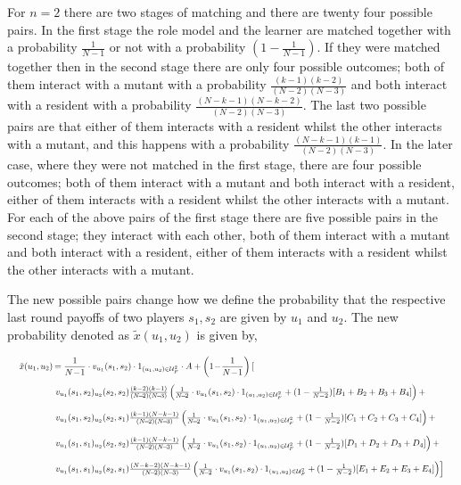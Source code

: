 \documentclass[11pt]{article}
\theoremstyle{plainCl1}
\theoremstyle{plainCl2}
\begin{document}
For \(n=2\) there are two stages of matching and there are twenty four possible pairs. In
the first stage the role model and the learner are matched together with a
probability $\frac{1}{N-1}$ or not with a probability $(1 - \frac{1}{N-1})$. If
they were matched together then in the second stage there are only four possible
outcomes; both of them interact with a mutant with a probability
$\frac{(k-1)(k-2)}{(N-2)(N-3)}$ and both interact with a resident with a
probability $\frac{(N-k-1)(N-k-2)}{(N-2)(N-3)}$. The last two possible pairs are
that either of them interacts with a resident whilst the other interacts with a
mutant, and this happens with a probability $\frac{(N-k-1)(k-1)}{(N-2)(N-3)}$.
In the later case, where they were not matched in the first stage, there are
four possible outcomes; both of them interact with a mutant and both interact
with a resident, either of them interacts with a resident whilst the other
interacts with a mutant. For each of the above pairs of the first stage there
are five possible pairs in the second stage; they interact with each other, both
of them interact with a mutant and both interact with a resident, either of them
interacts with a resident whilst the other interacts with a mutant.

The new possible pairs change how we define the probability that the
respective last round payoffs of two players \(s_1, s_2\) are given by \(u_1\)
and \(u_2\). The new probability denoted as \(\tilde{x}(u_1,u_2)\) is given by,

\begin{equation}
  \resizebox{.99\textwidth}{!}
  {%
$
  \setlength{\arraycolsep}{1pt}
  \begin{array}{llrl}
  \tilde{x}(u_1,u_2)	& = \displaystyle \frac{1}{N\!-\!1}\cdot v_{u_1}(s_1,s_2)\cdot 1_{(u_1,u_2)\in \mathcal{U}^2_F} \cdot A + \left(1\!-\!\frac{1}{N\!-\!1}\right) \left[ \right. \\[0.5cm] 
  & \left. v_{u_1}(s_1,s_2) _{u_2}(s_2,s_2)  \frac{\left(k - 2\right) \left(k - 1\right)}{(N\!-\!2)(N\!-\!3)}
  \left(\frac{1}{N\!-\!2}\cdot v_{u_1}(s_1,s_2)\cdot 1_{(u_1,u_2)\in \mathcal{U}^2_F} + (1 - \frac{1}{N - 2}) [B_1 + B_2 + B_3 + B_4]\right) + \right. \\[0.5cm] 
  & \left. v_{u_1}(s_1,s_2) _{u_2}(s_2,s_1)  \frac{\left(k - 1\right) \left(N - k - 1\right)}{(N\!-\!2)(N\!-\!3)} \left(\frac{1}{N\!-\!2}\cdot v_{u_1}(s_1,s_2)\cdot 1_{(u_1,u_2)\in \mathcal{U}^2_F} + (1 - \frac{1}{N - 2}) [C_1 + C_2 + C_3 + C_4]\right) + \right. \\[0.5cm] 
  & \left. v_{u_1}(s_1,s_1) _{u_2}(s_2,s_2)  \frac{\left(k - 1\right) \left(N - k - 1\right)}{(N\!-\!2)(N\!-\!3)} \left(\frac{1}{N\!-\!2}\cdot v_{u_1}(s_1,s_2)\cdot 1_{(u_1,u_2)\in \mathcal{U}^2_F} + (1 - \frac{1}{N - 2}) [D_1 + D_2 + D_3 + D_4]\right) + \right. \\[0.5cm] 
  & \left. v_{u_1}(s_1,s_1) _{u_2}(s_2,s_1)  \frac{\left(N - k - 2\right) \left(N - k - 1\right)}{(N\!-\!2)(N\!-\!3)} \left(\frac{1}{N\!-\!2}\cdot v_{u_1}(s_1,s_2)\cdot 1_{(u_1,u_2)\in \mathcal{U}^2_F} + (1 - \frac{1}{N - 2}) [E_1 + E_2 + E_3 + E_4]\right) \right]
  \end{array} $}
\end{equation}
\end{document}
